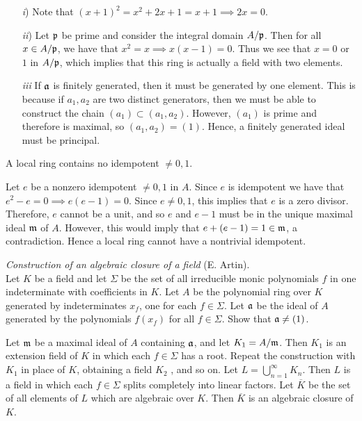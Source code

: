 \documentclass[10pt]{amsart}
\begin{document}
\begin{solution}
    \begin{itemize}
        \item[\emph{i})] Note that $(x + 1)^2 = x^2 + 2x + 1 = x + 1 \implies 2x = 0$.  
        \item[\emph{ii})] Let $\mathfrak{p}$ be prime and consider the integral 
        domain $A/\mathfrak{p}$. Then for all $x \in A/\mathfrak{p}$, we have that $x^2 = x
        \implies x(x-1) = 0$. Thus we see that $x = 0$ or $1$ in $A/\mathfrak{p}$, 
        which implies that this ring is actually a field with two elements.  
        \item[\emph{iii}] If $\mathfrak{a}$ is finitely generated, then it must be generated by one 
        element. This is because if $a_1, a_2$ are two distinct generators, then we must be able to 
        construct the chain $(a_1) \subset (a_1, a_2)$. However, $(a_1)$ is prime and therefore 
        is maximal, so $(a_1, a_2) = (1)$. Hence, a finitely generated ideal must be principal.  
    \end{itemize}
\end{solution}

\begin{exercise}
    A local ring contains no idempotent $\ne 0,1 $.
\end{exercise}

\begin{solution}
    Let $e$ be a nonzero idempotent $\ne 0, 1$ in $A$. 
    Since $e$ is idempotent we have that 
    $e^2 - e = 0 \implies e(e-1)= 0$. Since $e \ne 0, 1$, this implies that 
    $e$ is a zero divisor. Therefore, $e$ cannot be a unit, and so $e$ and $e - 1$
    must be in the unique maximal ideal $\mathfrak{m}$ of $A$. However, this would 
    imply that $e + (e - 1) = 1 \in \mathfrak{m}$, a contradiction. Hence a local ring cannot 
    have a nontrivial idempotent.
\end{solution}

\begin{exercise}\emph{Construction of an algebraic closure of a field} (E. Artin).\\
    Let $K$ be a field and let $\Sigma$ be the set of all irreducible monic 
    polynomials $f$ in one indeterminate with coefficients in $K$. 
    Let $A$ be the polynomial ring over $K$ generated by indeterminates 
    $x_f$, one for each $f \in \Sigma$. Let $\mathfrak{a}$ be the ideal of $A$ 
    generated by the polynomials $f(x_f)$ for all $f \in \Sigma$. 
    Show that $\mathfrak{a} \ne (1)$. 

    Let $\mathfrak{m}$ be a maximal ideal of $A$ containing $\mathfrak{a}$, and let 
    $K_1 = A/\mathfrak{m}$. Then $K_1$ is an extension field of $K$ in which 
    each $f \in \Sigma$ has a root. Repeat the construction with $K_1$ in place 
    of $K$, obtaining a field $K_2$ , and so on. Let $L = \bigcup_{n=1}^{\infty} K_n$.
    Then $L$ is a field in which each $f \in \Sigma$ splits completely into linear factors. 
    Let $\overline{K}$ be the set of all elements of $L$ which are algebraic over $K$. 
    Then $\overline{K}$ is an algebraic closure of $K$.
\end{exercise}
\end{document}
